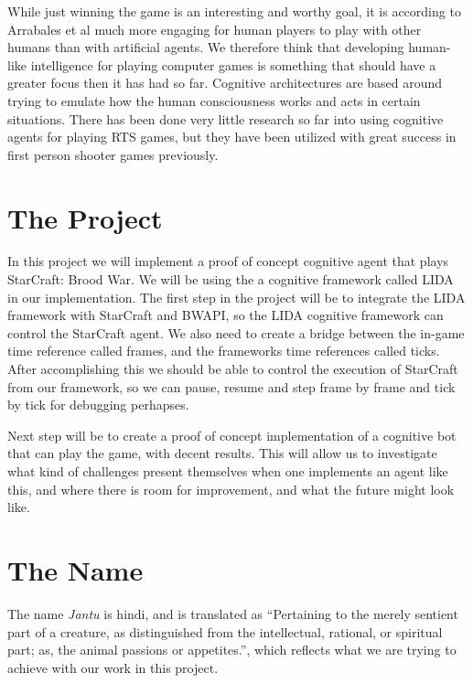 While just winning the game is an interesting and worthy goal, it is according to Arrabales et al much more engaging for human players to play with other humans than with artificial agents.\cite{arrabales2009gamechars} We therefore think that developing human-like intelligence for playing computer games is something that should have a greater focus then it has had so far. Cognitive architectures are based around trying to emulate how the human consciousness works and acts in certain situations. There has been done very little research so far into using cognitive agents for playing RTS games, but they have been utilized with great success in first person shooter games previously. %

\section{The Project}
In this project we will implement a proof of concept cognitive agent that plays StarCraft: Brood War. We will be using the a cognitive framework called LIDA in our implementation. The first step in the project will be to integrate the LIDA framework with StarCraft and BWAPI, so the LIDA cognitive framework can control the StarCraft agent. We also need to create a bridge between the in-game time reference called frames, and the frameworks time references called ticks. After accomplishing this we should be able to control the execution of StarCraft from our framework, so we can pause, resume and step frame by frame and tick by tick for debugging perhapses. 

Next step will be to create a proof of concept implementation of a cognitive bot that can play the game, with decent results. This will allow us to investigate what kind of challenges present themselves when one implements an agent like this, and where there is room for improvement, and what the future might look like.

\section{The Name}
\label{sec:name}
The name {\em Jantu} is hindi, and is translated as ``Pertaining to the merely sentient part of a creature, as distinguished from the intellectual, rational, or spiritual part; as, the animal passions or appetites.''\cite{hindijantu}, which reflects what we are trying to achieve with our work in this project.


